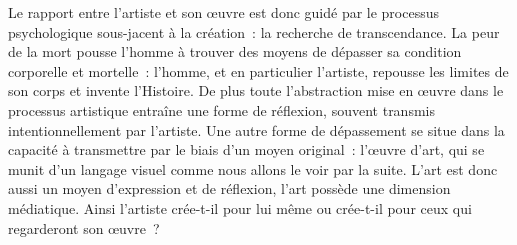 	Le rapport entre l’artiste et son œuvre est donc guidé par le processus psychologique sous-jacent à la création : la recherche de transcendance. La peur de la mort pousse l’homme à trouver des moyens de dépasser sa condition corporelle et mortelle : l’homme, et en particulier l’artiste, repousse les limites de son corps et invente l’Histoire. De plus toute l’abstraction mise en œuvre dans le processus artistique entraîne une forme de réflexion, souvent transmis intentionnellement par l’artiste. Une autre forme de dépassement se situe dans la capacité à transmettre par le biais d’un moyen original : l’œuvre d’art, qui se munit d’un langage visuel comme nous allons le voir par la suite. L’art est donc aussi un moyen d’expression et de réflexion, l’art possède une dimension médiatique. Ainsi l'artiste crée-t-il pour lui même ou crée-t-il pour ceux qui regarderont son œuvre ?  

